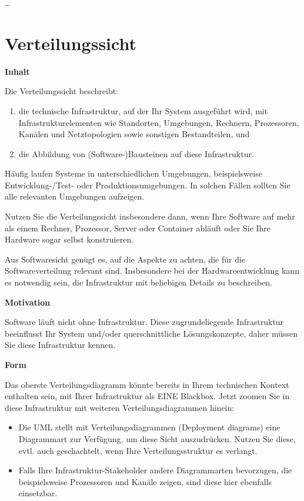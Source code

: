 \documentclass[
]{article}
\begin{document}
\ldots\hspace{0pt}

\section{Verteilungssicht}\label{section-deployment-view}

\textbf{Inhalt}

Die Verteilungssicht beschreibt:

\begin{enumerate}
\def\labelenumi{\arabic{enumi}.}
\item
  die technische Infrastruktur, auf der Ihr System ausgeführt wird, mit
  Infrastrukturelementen wie Standorten, Umgebungen, Rechnern,
  Prozessoren, Kanälen und Netztopologien sowie sonstigen Bestandteilen,
  und
\item
  die Abbildung von (Software-)Bausteinen auf diese Infrastruktur.
\end{enumerate}

Häufig laufen Systeme in unterschiedlichen Umgebungen, beispielsweise
Entwicklung-/Test- oder Produktionsumgebungen. In solchen Fällen sollten
Sie alle relevanten Umgebungen aufzeigen.

Nutzen Sie die Verteilungssicht insbesondere dann, wenn Ihre Software
auf mehr als einem Rechner, Prozessor, Server oder Container abläuft
oder Sie Ihre Hardware sogar selbst konstruieren.

Aus Softwaresicht genügt es, auf die Aspekte zu achten, die für die
Softwareverteilung relevant sind. Insbesondere bei der
Hardwareentwicklung kann es notwendig sein, die Infrastruktur mit
beliebigen Details zu beschreiben.

\textbf{Motivation}

Software läuft nicht ohne Infrastruktur. Diese zugrundeliegende
Infrastruktur beeinflusst Ihr System und/oder querschnittliche
Lösungskonzepte, daher müssen Sie diese Infrastruktur kennen.

\textbf{Form}

Das oberste Verteilungsdiagramm könnte bereits in Ihrem technischen
Kontext enthalten sein, mit Ihrer Infrastruktur als EINE Blackbox. Jetzt
zoomen Sie in diese Infrastruktur mit weiteren Verteilungsdiagrammen
hinein:

\begin{itemize}
\item
  Die UML stellt mit Verteilungsdiagrammen (Deployment diagrams) eine
  Diagrammart zur Verfügung, um diese Sicht auszudrücken. Nutzen Sie
  diese, evtl. auch geschachtelt, wenn Ihre Verteilungsstruktur es
  verlangt.
\item
  Falls Ihre Infrastruktur-Stakeholder andere Diagrammarten bevorzugen,
  die beispielsweise Prozessoren und Kanäle zeigen, sind diese hier
  ebenfalls einsetzbar.
\end{itemize}
\end{document}
